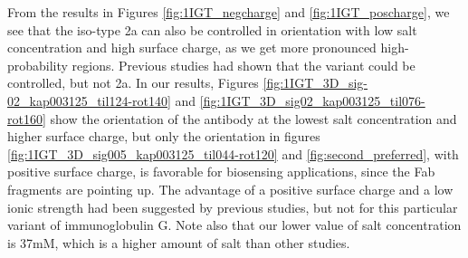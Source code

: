 From the results in Figures \ref{fig:1IGT_negcharge} and \ref{fig:1IGT_poscharge}, we see that the iso-type \ig 2a can also be controlled in orientation with low salt concentration and high surface charge, as we get more pronounced high-probability regions. 
Previous studies had shown that the  variant could be controlled, but not \ig 2a. 
In our results, Figures \ref{fig:1IGT_3D_sig-02_kap003125_til124-rot140} and \ref{fig:1IGT_3D_sig02_kap003125_til076-rot160} show the orientation of the antibody at the lowest salt concentration and higher surface charge, but only the orientation in figures \ref{fig:1IGT_3D_sig005_kap003125_til044-rot120} and \ref{fig:second_preferred}, with positive surface charge, is favorable for biosensing applications, since the Fab fragments are pointing up.
The advantage of a positive surface charge and a low ionic strength had been suggested by previous studies, but not for this particular variant of immunoglobulin G. Note also that our lower value of salt concentration is 37mM, which is a higher amount of salt than other studies.\cite{BuijsETal1997,ChenLiuZhouJiang2003}

 
